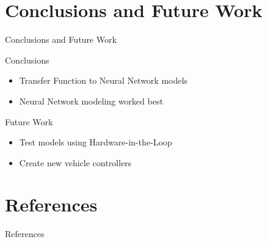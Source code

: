 \documentclass{beamer}
\begin{document}

\section{Conclusions and Future Work}

\begin{frame}{Conclusions and Future Work}
  \begin{block}{Conclusions}
    \begin{itemize}
      \item Transfer Function to Neural Network models
      \item Neural Network modeling worked best 
    \end{itemize}
  \end{block}
  \begin{block}{Future Work}
    \begin{itemize}
      \item Test models using Hardware-in-the-Loop
      \item Create new vehicle controllers 
    \end{itemize}
  \end{block}
\end{frame}


\section{References}

\begin{frame}{References}
  
  
\end{frame}

\end{document}
